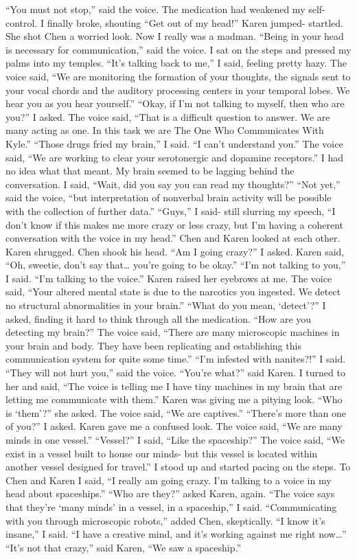 \documentclass[a4paper]{article}
\begin{document}
“You must not stop,” said the voice.
The medication had weakened my self-control. I finally broke, shouting “Get out of my head!”
Karen jumped- startled. She shot Chen a worried look. Now I really was a madman.
“Being in your head is necessary for communication,” said the voice.
I sat on the steps and pressed my palms into my temples. “It’s talking back to me,” I said, feeling pretty hazy.
The voice said, “We are monitoring the formation of your thoughts, the signals sent to your vocal chords and the auditory processing centers in your temporal lobes. We hear you as you hear yourself.”
“Okay, if I’m not talking to myself, then who are you?” I asked.
The voice said, “That is a difficult question to answer. We are many acting as one. In this task we are The One Who Communicates With Kyle.”
“Those drugs fried my brain,” I said. “I can’t understand you.”
The voice said, “We are working to clear your serotonergic and dopamine receptors.”
I had no idea what that meant. My brain seemed to be lagging behind the conversation. I said, “Wait, did you say you can read my thoughts?”
“Not yet,” said the voice, “but interpretation of nonverbal brain activity will be possible with the collection of further data.”
“Guys,” I said- still slurring my speech, “I don’t know if this makes me more crazy or less crazy, but I’m having a coherent conversation with the voice in my head.”
Chen and Karen looked at each other. Karen shrugged. Chen shook his head.
“Am I going crazy?” I asked.
Karen said, “Oh, sweetie, don’t say that… you’re going to be okay.”
“I’m not talking to you,” I said. “I’m talking to the voice.”
Karen raised her eyebrows at me.
The voice said, “Your altered mental state is due to the narcotics you ingested. We detect no structural abnormalities in your brain.”
“What do you mean, ‘detect’?” I asked, finding it hard to think through all the medication. “How are you detecting my brain?”
The voice said, “There are many microscopic machines in your brain and body. They have been replicating and establishing this communication system for quite some time.”
“I’m infested with nanites?!” I said.
“They will not hurt you,” said the voice.
“You’re what?” said Karen.
I turned to her and said, “The voice is telling me I have tiny machines in my brain that are letting me communicate with them.”
Karen was giving me a pitying look. “Who is ‘them’?” she asked.
The voice said, “We are captives.”
“There’s more than one of you?” I asked. Karen gave me a confused look.
The voice said, “We are many minds in one vessel.”
“Vessel?” I said, “Like the spaceship?”
The voice said, “We exist in a vessel built to house our minds- but this vessel is located within another vessel designed for travel.”
I stood up and started pacing on the steps. To Chen and Karen I said, “I really am going crazy. I’m talking to a voice in my head about spaceships.”
“Who are they?” asked Karen, again.
“The voice says that they’re ‘many minds’ in a vessel, in a spaceship,” I said.
“Communicating with you through microscopic robots,” added Chen, skeptically.
“I know it’s insane,” I said. “I have a creative mind, and it’s working against me right now…”
“It’s not that crazy,” said Karen, “We saw a spaceship.”
\end{document}
